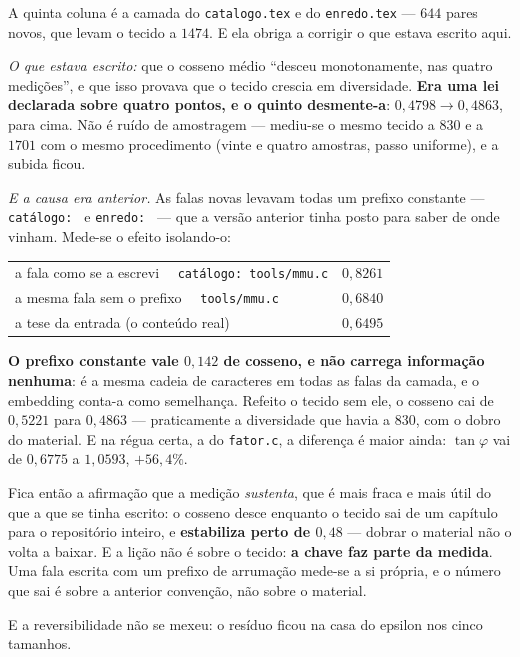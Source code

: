 \documentclass[11pt]{article}
\newcommand{\code}[1]{\texttt{\small #1}}
\theoremstyle{plain}
\theoremstyle{remark}
\begin{document}
\begin{itemize}
A quinta coluna é a camada do \code{catalogo.tex} e do \code{enredo.tex} --- $644$ pares novos, que
levam o tecido a $1474$. E ela obriga a corrigir o que estava escrito aqui.

\emph{O que estava escrito:} que o cosseno médio ``desceu monotonamente, nas quatro medições'', e
que isso provava que o tecido crescia em diversidade. \textbf{Era uma lei declarada sobre quatro
pontos, e o quinto desmente-a}: $0{,}4798 \to 0{,}4863$, para cima. Não é ruído de amostragem ---
mediu-se o mesmo tecido a $830$ e a $1701$ com o mesmo procedimento (vinte e quatro amostras, passo
uniforme), e a subida ficou.

\emph{E a causa era anterior.} As falas novas levavam todas um prefixo constante --- \code{catálogo:~} e
\code{enredo:~} --- que a versão anterior tinha posto para saber de onde vinham. Mede-se o efeito isolando-o:

\begin{center}\small
\begin{tabular}{lr}
\hline
a fala como se a escrevi \ \ \code{catálogo: tools/mmu.c} & $0{,}8261$ \\
a mesma fala sem o prefixo \ \ \code{tools/mmu.c} & $0{,}6840$ \\
a tese da entrada (o conteúdo real) & $0{,}6495$ \\
\hline
\end{tabular}
\end{center}

\textbf{O prefixo constante vale $0{,}142$ de cosseno, e não carrega informação nenhuma}: é a mesma
cadeia de caracteres em todas as falas da camada, e o embedding conta-a como semelhança. Refeito o
tecido sem ele, o cosseno cai de $0{,}5221$ para $0{,}4863$ --- praticamente a diversidade que havia a
$830$, com o dobro do material. E na régua certa, a do \code{fator.c}, a diferença é maior ainda:
$\tan\varphi$ vai de $0{,}6775$ a $1{,}0593$, \textbf{$+56{,}4\%$}.

Fica então a afirmação que a medição \emph{sustenta}, que é mais fraca e mais útil do que a que se
tinha escrito: o cosseno desce enquanto o tecido sai de um capítulo para o repositório inteiro, e
\textbf{estabiliza perto de $0{,}48$} --- dobrar o material não o volta a baixar. E a lição não é
sobre o tecido: \textbf{a chave faz parte da medida}. Uma fala escrita com um prefixo de arrumação
mede-se a si própria, e o número que sai é sobre a anterior convenção, não sobre o material.

E a reversibilidade não se mexeu: o resíduo ficou na casa do epsilon nos cinco tamanhos.


\end{itemize}
\end{document}
